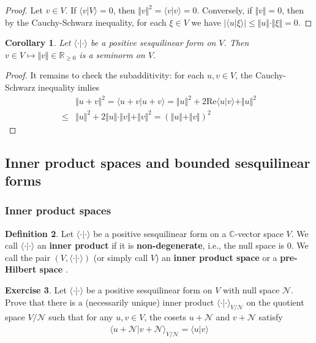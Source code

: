 \documentclass[12pt,b5paper,notitlepage]{article}
\theoremstyle{definition}
\newtheorem{df}{Definition}[section]
\newtheorem{exe}[df]{Exercise}
\theoremstyle{plain}
\newtheorem{co}[df]{Corollary}
\newcommand{\bk}[1]{\langle {#1}\rangle}
\newcommand{\scr}{\mathscr}
\newcommand{\Cbb}{\mathbb C}
\newcommand{\Rbb}{\mathbb R}
\newcommand{\Real}{\mathrm{Re}}
\numberwithin{equation}{section}
\begin{document}
\begin{proof}
Let $v\in V$. If $\bk{v|V}=0$, then $\Vert v\Vert^2=\bk{v|v}=0$. Conversely, if $\Vert v\Vert=0$, then by the Cauchy-Schwarz inequality, for each $\xi\in V$ we have $|\bk{u|\xi}|\leq \Vert u\Vert\cdot\Vert\xi\Vert=0$.
\end{proof}





\begin{co}\label{lb115}
Let $\bk{\cdot|\cdot}$ be a positive sesquilinear form on $V$. Then $v\in V\mapsto\Vert v\Vert\in\Rbb_{\geq0}$ is a seminorm on $V$. 
\end{co}

\begin{proof}
It remains to check the subadditivity: for each $u,v\in V$, the Cauchy-Schwarz inequality imlies
\begin{align*}
&\Vert u+v\Vert^2=\bk{u+v|u+v}=\Vert u\Vert^2+2\Real\bk{u|v}+\Vert u\Vert^2\\
\leq& \Vert u\Vert^2+2\Vert u\Vert\cdot\Vert v\Vert+\Vert v\Vert^2=(\Vert u\Vert+\Vert v\Vert)^2
\end{align*}
\end{proof}






\subsection{Inner product spaces and bounded sesquilinear forms}




\subsubsection{Inner product spaces}




\begin{df}
Let $\bk{\cdot|\cdot}$ be a positive sesquilinear form on a $\Cbb$-vector space $V$. We call $\bk{\cdot|\cdot}$ an \textbf{inner product}  if it is  \textbf{non-degenerate}, i.e., the null space is $0$.  We call the pair $(V,\bk{\cdot|\cdot})$ (or simply call $V$) an \textbf{inner product space} or a \textbf{pre-Hilbert space} .
\end{df}



\begin{exe}
Let $\bk{\cdot|\cdot}$ be a positive sesquilinear form on $V$ with null space $\scr N$. Prove that there is a (necessarily unique) inner product $\bk{\cdot|\cdot}_{V/\scr N}$ on the quotient space $V/\scr N$ such that for any $u,v\in V$, the cosets $u+\scr N$ and $v+\scr N$ satisfy
\begin{align*}
\bk{u+\scr N|v+\scr N }_{V/\scr N}=\bk{u|v}
\end{align*}
\end{exe}
\end{document}

